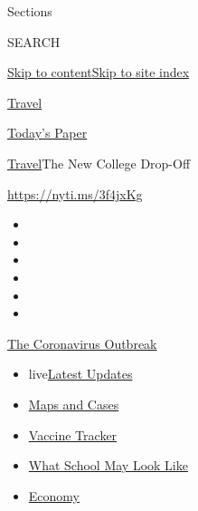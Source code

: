 Sections

SEARCH

\protect\hyperlink{site-content}{Skip to
content}\protect\hyperlink{site-index}{Skip to site index}

\href{https://www.nytimes.com/section/travel}{Travel}

\href{https://myaccount.nytimes.com/auth/login?response_type=cookie\&client_id=vi}{}

\href{https://www.nytimes.com/section/todayspaper}{Today's Paper}

\href{/section/travel}{Travel}\textbar{}The New College Drop-Off

\url{https://nyti.ms/3f4jxKg}

\begin{itemize}
\item
\item
\item
\item
\item
\item
\end{itemize}

\href{https://www.nytimes.com/news-event/coronavirus?action=click\&pgtype=Article\&state=default\&region=TOP_BANNER\&context=storylines_menu}{The
Coronavirus Outbreak}

\begin{itemize}
\tightlist
\item
  live\href{https://www.nytimes.com/2020/08/01/world/coronavirus-covid-19.html?action=click\&pgtype=Article\&state=default\&region=TOP_BANNER\&context=storylines_menu}{Latest
  Updates}
\item
  \href{https://www.nytimes.com/interactive/2020/us/coronavirus-us-cases.html?action=click\&pgtype=Article\&state=default\&region=TOP_BANNER\&context=storylines_menu}{Maps
  and Cases}
\item
  \href{https://www.nytimes.com/interactive/2020/science/coronavirus-vaccine-tracker.html?action=click\&pgtype=Article\&state=default\&region=TOP_BANNER\&context=storylines_menu}{Vaccine
  Tracker}
\item
  \href{https://www.nytimes.com/interactive/2020/07/29/us/schools-reopening-coronavirus.html?action=click\&pgtype=Article\&state=default\&region=TOP_BANNER\&context=storylines_menu}{What
  School May Look Like}
\item
  \href{https://www.nytimes.com/live/2020/07/31/business/stock-market-today-coronavirus?action=click\&pgtype=Article\&state=default\&region=TOP_BANNER\&context=storylines_menu}{Economy}
\end{itemize}

